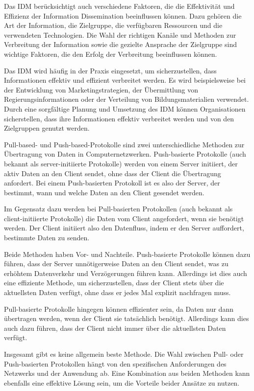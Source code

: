 Das IDM berücksichtigt auch verschiedene Faktoren, die die Effektivität und Effizienz der Information Dissemination beeinflussen können. Dazu gehören die Art der Information, die Zielgruppe, die verfügbaren Ressourcen und die verwendeten Technologien. Die Wahl der richtigen Kanäle und Methoden zur Verbreitung der Information sowie die gezielte Ansprache der Zielgruppe sind wichtige Faktoren, die den Erfolg der Verbreitung beeinflussen können.

Das IDM wird häufig in der Praxis eingesetzt, um sicherzustellen, dass Informationen effektiv und effizient verbreitet werden. Es wird beispielsweise bei der Entwicklung von Marketingstrategien, der Übermittlung von Regierungsinformationen oder der Verteilung von Bildungsmaterialien verwendet. Durch eine sorgfältige Planung und Umsetzung des IDM können Organisationen sicherstellen, dass ihre Informationen effektiv verbreitet werden und von den Zielgruppen genutzt werden.

Pull-based- und Push-based-Protokolle sind zwei unterschiedliche Methoden zur Übertragung von Daten in Computernetzwerken. Push-basierte Protokolle (auch bekannt als server-initiierte Protokolle) werden von einem Server initiiert, der aktiv Daten an den Client sendet, ohne dass der Client die Übertragung anfordert. Bei einem Push-basierten Protokoll ist es also der Server, der bestimmt, wann und welche Daten an den Client gesendet werden.

Im Gegensatz dazu werden bei Pull-basierten Protokollen (auch bekannt als client-initiierte Protokolle) die Daten vom Client angefordert, wenn sie benötigt werden. Der Client initiiert also den Datenfluss, indem er den Server auffordert, bestimmte Daten zu senden.

Beide Methoden haben Vor- und Nachteile. Push-basierte Protokolle können dazu führen, dass der Server unnötigerweise Daten an den Client sendet, was zu erhöhtem Datenverkehr und Verzögerungen führen kann. Allerdings ist dies auch eine effiziente Methode, um sicherzustellen, dass der Client stets über die aktuellsten Daten verfügt, ohne dass er jedes Mal explizit nachfragen muss.

Pull-basierte Protokolle hingegen können effizienter sein, da Daten nur dann übertragen werden, wenn der Client sie tatsächlich benötigt. Allerdings kann dies auch dazu führen, dass der Client nicht immer über die aktuellsten Daten verfügt.

Insgesamt gibt es keine allgemein beste Methode. Die Wahl zwischen Pull- oder Push-basierten Protokollen hängt von den spezifischen Anforderungen des Netzwerks und der Anwendung ab. Eine Kombination aus beiden Methoden kann ebenfalls eine effektive Lösung sein, um die Vorteile beider Ansätze zu nutzen.

